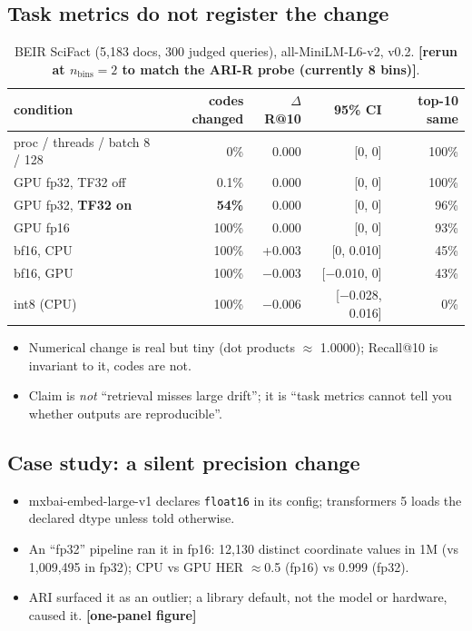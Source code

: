 \documentclass{article}
\newcommand{\todo}[1]{\textcolor{sTwo}{\textbf{[#1]}}}
\begin{document}
\subsection{Task metrics do not register the change}\label{sec:retrieval}
\begin{table}[h]\centering\footnotesize
\caption{BEIR SciFact (5{,}183 docs, 300 judged queries), all-MiniLM-L6-v2, v0.2. \todo{rerun at $n_{\text{bins}}{=}2$ to match the ARI-R probe (currently 8 bins)}.}\label{tab:scifact}
\begin{tabular}{lrrrr}
\toprule
condition & codes changed & $\Delta$R@10 & 95\% CI & top-10 same \\
\midrule
proc / threads / batch 8 / 128 & 0\% & 0.000 & [0, 0] & 100\% \\
GPU fp32, TF32 off & 0.1\% & 0.000 & [0, 0] & 100\% \\
GPU fp32, \textbf{TF32 on} & \textbf{54\%} & 0.000 & [0, 0] & 96\% \\
GPU fp16 & 100\% & 0.000 & [0, 0] & 93\% \\
bf16, CPU & 100\% & +0.003 & [0, 0.010] & 45\% \\
bf16, GPU & 100\% & $-$0.003 & [$-$0.010, 0] & 43\% \\
int8 (CPU) & 100\% & $-$0.006 & [$-$0.028, 0.016] & 0\% \\
\bottomrule
\end{tabular}
\end{table}
\begin{itemize}
  \item Numerical change is real but tiny (dot products $\approx$ 1.0000); Recall@10 is invariant to it, codes are not.
  \item Claim is \emph{not} ``retrieval misses large drift''; it is ``task metrics cannot tell you whether outputs are reproducible''.
\end{itemize}

\subsection{Case study: a silent precision change}
\begin{itemize}
  \item mxbai-embed-large-v1 declares \texttt{float16} in its config; transformers 5 loads the declared dtype unless told otherwise.
  \item An ``fp32'' pipeline ran it in fp16: 12{,}130 distinct coordinate values in 1M (vs 1{,}009{,}495 in fp32); CPU vs GPU HER $\approx$0.5 (fp16) vs 0.999 (fp32).
  \item ARI surfaced it as an outlier; a library default, not the model or hardware, caused it. \todo{one-panel figure}
\end{itemize}
\end{document}
